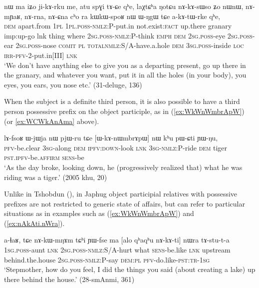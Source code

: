 \begin{exe}
\ex \label{ex:iZo.jikArku}
\gll   nɯ ma iʑo ji-kɤ-rku me,  atu spɣi tɤ-ɕe qʰe, laχtɕʰa ŋotɕu nɤ-kɤ-sɯso ʑo nɯnɯ, 
nɤ-mɲaʁ, nɤ-rna, nɤ-ɕna cʰo ra kɯ\redp{}kɯ-spoʁ nɯ ɯ-ŋgɯ tɕe a-kɤ-tɯ-rke qʰe, \\
\textsc{dem} apart.from \textsc{1pl} \textsc{1pl}.\textsc{poss}-\textsc{nmlz}:P-put.in not.exist:\textsc{fact} up.there granary imp:up-go lnk thing where \textsc{2sg}.\textsc{poss}-\textsc{nmlz}:P-think \textsc{emph} \textsc{dem} \textsc{2sg}.\textsc{poss}-eye  \textsc{2sg}.\textsc{poss}-ear  \textsc{2sg}.\textsc{poss}-nose \textsc{comit} \textsc{pl}  \textsc{total}\redp{}\textsc{nmlz}:S/A-have.a.hole \textsc{dem} \textsc{3sg}.\textsc{poss}-inside \textsc{loc} \textsc{irr}-\textsc{pfv}-2-put.in[III] \textsc{lnk} \\
\glt `We don't have anything else to give you as a departing present, go up there in the granary, and whatever you want, put it in all the holes (in your body), you eyes, you ears, you nose etc.' (31-deluge, 136)
\end{exe}  

When the subject is a definite third person, it is also possible to have a third person possessive prefix on the object participle, as in (\ref{ex:WkWnWmbrApW}) (or \ref{ex:WCWkAnAma} above).

\begin{exe}
\ex \label{ex:WkWnWmbrApW}
\gll  lɤ-fsoʁ ɯ-jɯja nɯ pjɯ-ru tɕe [ɯ-kɤ-nɯmbrɤpɯ] nɯ kʰu pɯ-ɕti ɲɯ-ŋu,  \\
\textsc{pfv}-be.clear    \textsc{3sg}-along  \textsc{dem} \textsc{ipfv:down}-look \textsc{lnk} \textsc{3sg-nmlz:P}-ride \textsc{dem} tiger \textsc{pst.ipfv}-be.\textsc{affirm}  \textsc{sens}-be \\
\glt `As the day broke, looking down, he (progressively realized that) what he was riding was a tiger.' (2005 khu, 20)
\end{exe}

Unlike in Tshobdun (\citealt[10]{jacksonlin07}), in Japhug object participial relatives with possessive prefixes are not restricted to generic state of affairs, but can refer to particular situations as in examples such as (\ref{ex:WkWnWmbrApW}) and (\ref{ex:nAkAti.nWra}).

\begin{exe}
\ex \label{ex:nAkAti.nWra}
\gll a-ɬaʁ, tɕe nɤ-kɯ-mŋɤm tɕʰi ɲɯ-fse ma [alo qʰaqʰu nɤ-kɤ-ti] nɯra tɤ-stu-t-a \\
\textsc{1sg}.\textsc{poss}-aunt \textsc{lnk} \textsc{2sg}.\textsc{poss}-\textsc{nmlz}:S/A-hurt what \textsc{sens}-be.like \textsc{lnk} upstream behind.the.house \textsc{2sg}.\textsc{poss}-\textsc{nmlz}:P-say \textsc{dem}:\textsc{pl} \textsc{pfv}-do.like-\textsc{pst}:\textsc{tr}-\textsc{1sg} \\
\glt `Stepmother, how do you feel, I did the things you said (about creating a lake) up there behind the house.' (28-smAnmi, 361)
\end{exe}


